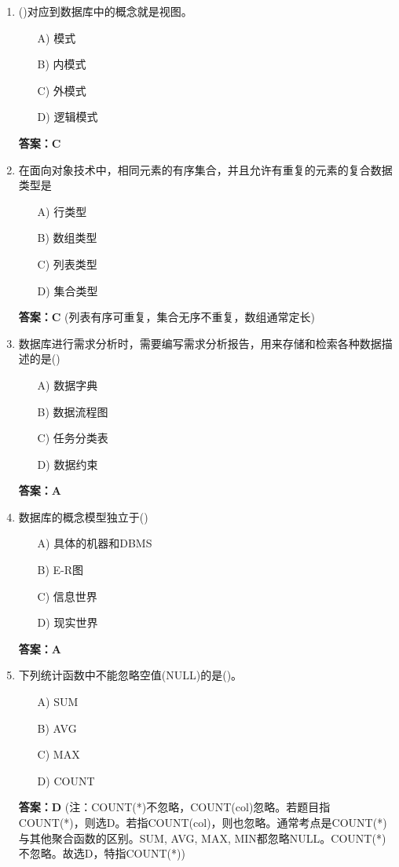 \documentclass[a4paper,12pt]{article}
\begin{document}
\begin{enumerate}[label=\arabic*.]
\item ()对应到数据库中的概念就是视图。
\begin{itemize}
    \item[A)] 模式
    \item[B)] 内模式
    \item[C)] 外模式
    \item[D)] 逻辑模式
\end{itemize}
\textbf{答案：C}

\item 在面向对象技术中，相同元素的有序集合，并且允许有重复的元素的复合数据类型是
\begin{itemize}
    \item[A)] 行类型
    \item[B)] 数组类型
    \item[C)] 列表类型
    \item[D)] 集合类型
\end{itemize}
\textbf{答案：C} (列表有序可重复，集合无序不重复，数组通常定长)

\item 数据库进行需求分析时，需要编写需求分析报告，用来存储和检索各种数据描述的是()
\begin{itemize}
    \item[A)] 数据字典
    \item[B)] 数据流程图
    \item[C)] 任务分类表
    \item[D)] 数据约束
\end{itemize}
\textbf{答案：A}

\item 数据库的概念模型独立于()
\begin{itemize}
    \item[A)] 具体的机器和DBMS
    \item[B)] E-R图
    \item[C)] 信息世界
    \item[D)] 现实世界
\end{itemize}
\textbf{答案：A}

\item 下列统计函数中不能忽略空值(NULL)的是()。
\begin{itemize}
    \item[A)] SUM
    \item[B)] AVG
    \item[C)] MAX
    \item[D)] COUNT
\end{itemize}
\textbf{答案：D} (注：COUNT(*)不忽略，COUNT(col)忽略。若题目指COUNT(*)，则选D。若指COUNT(col)，则也忽略。通常考点是COUNT(*)与其他聚合函数的区别。SUM, AVG, MAX, MIN都忽略NULL。COUNT(*)不忽略。故选D，特指COUNT(*))


\end{enumerate}
\end{document}
